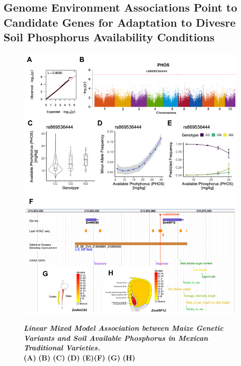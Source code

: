 \subsection{Genome Environment Associations Point to Candidate Genes for Adaptation to Divesre Soil Phosphorus Availability Conditions}

\begin{figure}[b]
\centering
\includegraphics[width=\linewidth]{Chapter-2/figs/PHOS_mlm.png}
\caption[]{}
\label{fig:PHOS_mlm}
\end{figure}
\clearpage

\addtocounter{figure}{-1}
\begin{figure} [t!]
\caption[Linear Mixed Model Association between Maize Genetic Variants and Soil Available Phosphorus in Mexican Traditional Varieties]{\textit{\textbf{Linear Mixed Model Association between Maize Genetic Variants and Soil Available Phosphorus in Mexican Traditional Varieties.}}
\\\hspace{\textwidth}
\textbf{(A)}  \textbf{(B)}  \textbf{(C)} \textbf{(D)} \textbf{(E)}\textbf{(F)} \textbf{(G)} \textbf{(H)} 
 }
\end{figure}

